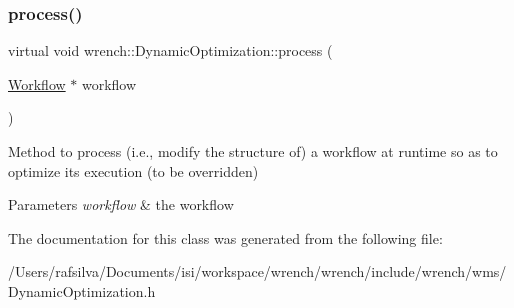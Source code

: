 \subsubsection{\texorpdfstring{process()}{process()}}
{\footnotesize\ttfamily virtual void wrench\+::\+Dynamic\+Optimization\+::process (\begin{DoxyParamCaption}\item[{\hyperlink{classwrench_1_1_workflow}{Workflow} $\ast$}]{workflow }\end{DoxyParamCaption})\hspace{0.3cm}{\ttfamily [pure virtual]}}



Method to process (i.\+e., modify the structure of) a workflow at runtime so as to optimize its execution (to be overridden) 


\begin{DoxyParams}{Parameters}
{\em workflow} & the workflow \\
\hline
\end{DoxyParams}


The documentation for this class was generated from the following file\+:\begin{DoxyCompactItemize}
\item 
/\+Users/rafsilva/\+Documents/isi/workspace/wrench/wrench/include/wrench/wms/Dynamic\+Optimization.\+h\end{DoxyCompactItemize}

